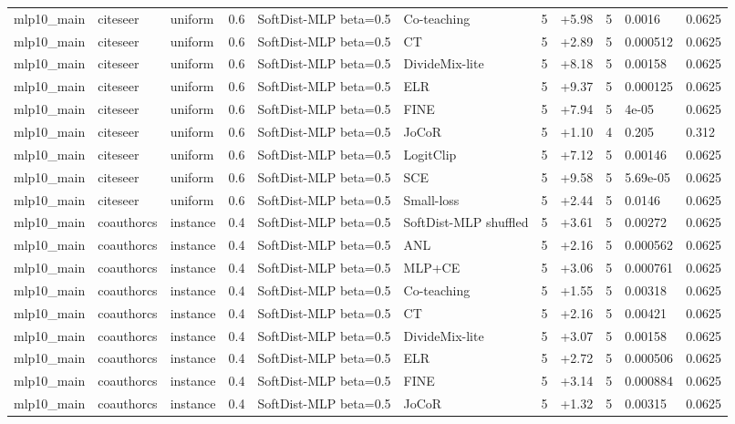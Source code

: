 \begin{table}[t]
\begin{tabular}{llllllrlrll}
mlp10_main & citeseer & uniform & 0.6 & SoftDist-MLP beta=0.5 & Co-teaching & 5 & +5.98 & 5 & 0.0016 & 0.0625 \\
mlp10_main & citeseer & uniform & 0.6 & SoftDist-MLP beta=0.5 & CT & 5 & +2.89 & 5 & 0.000512 & 0.0625 \\
mlp10_main & citeseer & uniform & 0.6 & SoftDist-MLP beta=0.5 & DivideMix-lite & 5 & +8.18 & 5 & 0.00158 & 0.0625 \\
mlp10_main & citeseer & uniform & 0.6 & SoftDist-MLP beta=0.5 & ELR & 5 & +9.37 & 5 & 0.000125 & 0.0625 \\
mlp10_main & citeseer & uniform & 0.6 & SoftDist-MLP beta=0.5 & FINE & 5 & +7.94 & 5 & 4e-05 & 0.0625 \\
mlp10_main & citeseer & uniform & 0.6 & SoftDist-MLP beta=0.5 & JoCoR & 5 & +1.10 & 4 & 0.205 & 0.312 \\
mlp10_main & citeseer & uniform & 0.6 & SoftDist-MLP beta=0.5 & LogitClip & 5 & +7.12 & 5 & 0.00146 & 0.0625 \\
mlp10_main & citeseer & uniform & 0.6 & SoftDist-MLP beta=0.5 & SCE & 5 & +9.58 & 5 & 5.69e-05 & 0.0625 \\
mlp10_main & citeseer & uniform & 0.6 & SoftDist-MLP beta=0.5 & Small-loss & 5 & +2.44 & 5 & 0.0146 & 0.0625 \\
mlp10_main & coauthorcs & instance & 0.4 & SoftDist-MLP beta=0.5 & SoftDist-MLP shuffled & 5 & +3.61 & 5 & 0.00272 & 0.0625 \\
mlp10_main & coauthorcs & instance & 0.4 & SoftDist-MLP beta=0.5 & ANL & 5 & +2.16 & 5 & 0.000562 & 0.0625 \\
mlp10_main & coauthorcs & instance & 0.4 & SoftDist-MLP beta=0.5 & MLP+CE & 5 & +3.06 & 5 & 0.000761 & 0.0625 \\
mlp10_main & coauthorcs & instance & 0.4 & SoftDist-MLP beta=0.5 & Co-teaching & 5 & +1.55 & 5 & 0.00318 & 0.0625 \\
mlp10_main & coauthorcs & instance & 0.4 & SoftDist-MLP beta=0.5 & CT & 5 & +2.16 & 5 & 0.00421 & 0.0625 \\
mlp10_main & coauthorcs & instance & 0.4 & SoftDist-MLP beta=0.5 & DivideMix-lite & 5 & +3.07 & 5 & 0.00158 & 0.0625 \\
mlp10_main & coauthorcs & instance & 0.4 & SoftDist-MLP beta=0.5 & ELR & 5 & +2.72 & 5 & 0.000506 & 0.0625 \\
mlp10_main & coauthorcs & instance & 0.4 & SoftDist-MLP beta=0.5 & FINE & 5 & +3.14 & 5 & 0.000884 & 0.0625 \\
mlp10_main & coauthorcs & instance & 0.4 & SoftDist-MLP beta=0.5 & JoCoR & 5 & +1.32 & 5 & 0.00315 & 0.0625 \\

\end{tabular}
\end{table}
